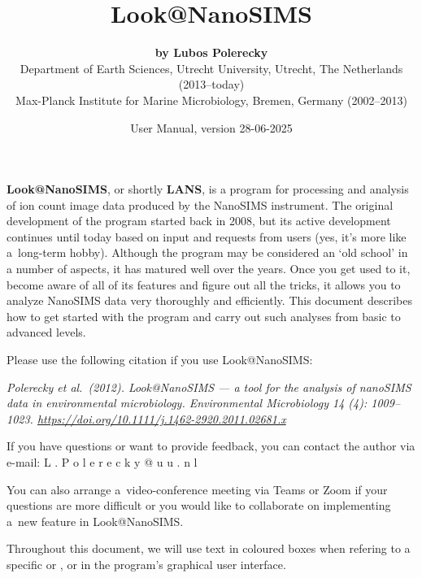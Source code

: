 \documentclass[a4paper, 11pt]{article}
\title{\LARGE \bf Look@NanoSIMS}
\author{{\large\bf by Lubos Polerecky}\\[6mm]
{\small Department of Earth Sciences, Utrecht University, Utrecht, The Netherlands (2013--today)} \\%
{\small Max-Planck Institute for Marine Microbiology, Bremen, Germany (2002--2013)}\\[3mm]}
\date{User Manual, version 28-06-2025}
\newcommand{\ttt}[1]{\textsf{#1}}
\begin{document}
\maketitle
\reversemarginpar 

\textbf{Look@NanoSIMS}, or shortly \textbf{LANS}, is a program for processing and analysis of ion count image data produced by the NanoSIMS instrument. The original development of the program started back in 2008, but its active development continues until today based on input and requests from users (yes, it's more like a~long-term hobby). Although the program may be considered an `old school' in a number of aspects, it has matured well over the years. Once you get used to it, become aware of all of its features and figure out all the tricks, it allows you to analyze NanoSIMS data very thoroughly and efficiently. This document describes how to get started with the program and carry out such analyses from basic to advanced levels. 
\tcbe

\vskip4mm

Please use the following citation if you use Look@NanoSIMS:
\vskip0.5mm
\begin{center}
\begin{minipage}{0.93\textwidth}
\textsl{\small Polerecky et al.~(2012). Look@NanoSIMS --- a tool for the analysis of nanoSIMS data in environmental microbiology. \textit{Environmental Microbiology} 14 (4): 1009--1023. \url{ https://doi.org/10.1111/j.1462-2920.2011.02681.x}}
\end{minipage}
\end{center}
\tcbe

\vskip4mm

If you have questions or want to provide feedback, you can contact the author via e-mail: 
\vskip2mm
\hspace{0.5cm} \ttt{L . P o l e r e c k y @ u u . n l}

\vskip1mm\noindent You can also arrange a~video-conference meeting via Teams or Zoom if your questions are more difficult or you would like to collaborate on implementing a~new feature in Look@NanoSIMS.
\tcbe

\vskip4mm

Throughout this document, we will use text in coloured boxes when refering to a specific  or ,  or  in the program's graphical user interface.
\tcbe
\end{document}

